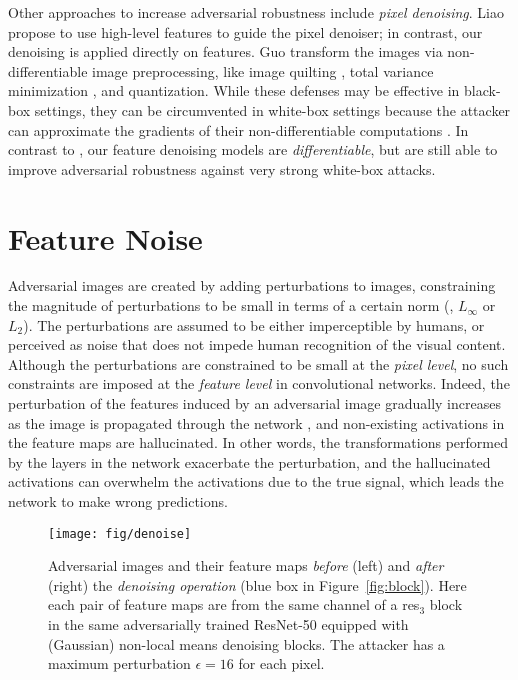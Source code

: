 \documentclass[10pt,twocolumn,letterpaper]{article}
\begin{document}
Other approaches to increase adversarial robustness include \emph{pixel denoising}. Liao \etal \cite{Liao2018} propose to use high-level features to guide the pixel denoiser; in contrast, our denoising is applied directly on features.
Guo \etal \cite{Guo2018} transform the images via non-differentiable image preprocessing, like image quilting \cite{Efros2001}, total variance minimization \cite{Rudin1992}, and quantization. While these defenses may be effective in black-box settings, they can be circumvented in white-box settings because the attacker can approximate the gradients of their non-differentiable computations \cite{Athalye2018}. In contrast to \cite{Guo2018}, our feature denoising models are \emph{differentiable}, but are still able to improve adversarial robustness against very strong white-box attacks.

\section{Feature Noise}\label{sec:noise}
Adversarial images are created by adding perturbations to images, constraining the magnitude of perturbations to be small in terms of a certain norm (\eg, $L_\infty$ or $L_2$).
The perturbations are assumed to be either imperceptible by humans, or perceived as noise that does not impede human recognition of the visual content. Although the perturbations are constrained to be small at the \emph{pixel level}, no such constraints are imposed at the \emph{feature level} in convolutional networks. Indeed, the perturbation of the features induced by an adversarial image gradually increases as the image is propagated through the network \cite{Liao2018, Guo2018}, and non-existing activations in the feature maps are hallucinated. In other words, the transformations performed by the layers in the network exacerbate the perturbation, and the hallucinated activations can overwhelm the activations due to the true signal, which leads the network to make wrong predictions.

\begin{figure}[t]
\centering
\vspace{-.5em}
\texttt{[image: fig/denoise]}
\vspace{-1.5em}
\caption{Adversarial images and their feature maps \emph{before} (left) and \emph{after} (right) the \emph{denoising operation} (blue box in Figure~\ref{fig:block}).
Here each pair of feature maps are from the same channel of a res$_3$ block in the same adversarially trained ResNet-50 equipped with (Gaussian) non-local means denoising blocks. The attacker has a maximum perturbation $\epsilon\!=\!16$ for each pixel.}
\label{fig:denoise}
\vspace{-1em}
\end{figure}
\end{document}
